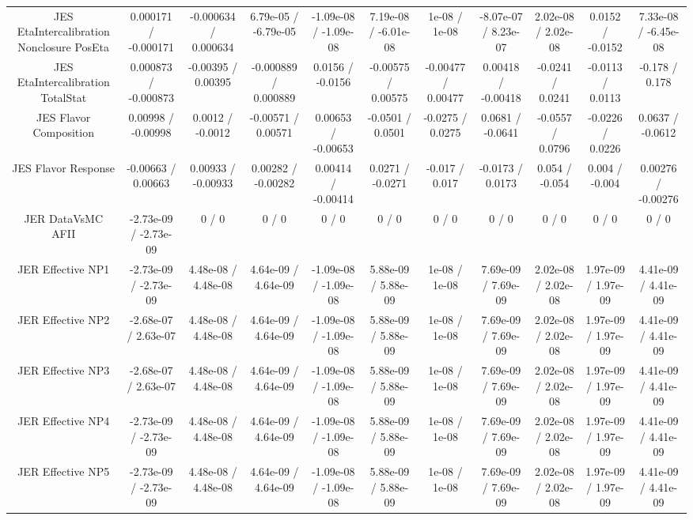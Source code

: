 \begin{table}[htbp]
\begin{center}
\begin{tabular}{|c|c|c|c|c|c|c|c|c|c|c|}
  JES EtaIntercalibration Nonclosure PosEta & 0.000171 / -0.000171 & -0.000634 / 0.000634 & 6.79e-05 / -6.79e-05 & -1.09e-08 / -1.09e-08 & 7.19e-08 / -6.01e-08 & 1e-08 / 1e-08 & -8.07e-07 / 8.23e-07 & 2.02e-08 / 2.02e-08 & 0.0152 / -0.0152 & 7.33e-08 / -6.45e-08 \\ 
  JES EtaIntercalibration TotalStat & 0.000873 / -0.000873 & -0.00395 / 0.00395 & -0.000889 / 0.000889 & 0.0156 / -0.0156 & -0.00575 / 0.00575 & -0.00477 / 0.00477 & 0.00418 / -0.00418 & -0.0241 / 0.0241 & -0.0113 / 0.0113 & -0.178 / 0.178 \\ 
  JES Flavor Composition & 0.00998 / -0.00998 & 0.0012 / -0.0012 & -0.00571 / 0.00571 & 0.00653 / -0.00653 & -0.0501 / 0.0501 & -0.0275 / 0.0275 & 0.0681 / -0.0641 & -0.0557 / 0.0796 & -0.0226 / 0.0226 & 0.0637 / -0.0612 \\ 
  JES Flavor Response & -0.00663 / 0.00663 & 0.00933 / -0.00933 & 0.00282 / -0.00282 & 0.00414 / -0.00414 & 0.0271 / -0.0271 & -0.017 / 0.017 & -0.0173 / 0.0173 & 0.054 / -0.054 & 0.004 / -0.004 & 0.00276 / -0.00276 \\ 
  JER DataVsMC AFII & -2.73e-09 / -2.73e-09 & 0 / 0 & 0 / 0 & 0 / 0 & 0 / 0 & 0 / 0 & 0 / 0 & 0 / 0 & 0 / 0 & 0 / 0 \\ 
  JER Effective NP1 & -2.73e-09 / -2.73e-09 & 4.48e-08 / 4.48e-08 & 4.64e-09 / 4.64e-09 & -1.09e-08 / -1.09e-08 & 5.88e-09 / 5.88e-09 & 1e-08 / 1e-08 & 7.69e-09 / 7.69e-09 & 2.02e-08 / 2.02e-08 & 1.97e-09 / 1.97e-09 & 4.41e-09 / 4.41e-09 \\ 
  JER Effective NP2 & -2.68e-07 / 2.63e-07 & 4.48e-08 / 4.48e-08 & 4.64e-09 / 4.64e-09 & -1.09e-08 / -1.09e-08 & 5.88e-09 / 5.88e-09 & 1e-08 / 1e-08 & 7.69e-09 / 7.69e-09 & 2.02e-08 / 2.02e-08 & 1.97e-09 / 1.97e-09 & 4.41e-09 / 4.41e-09 \\ 
  JER Effective NP3 & -2.68e-07 / 2.63e-07 & 4.48e-08 / 4.48e-08 & 4.64e-09 / 4.64e-09 & -1.09e-08 / -1.09e-08 & 5.88e-09 / 5.88e-09 & 1e-08 / 1e-08 & 7.69e-09 / 7.69e-09 & 2.02e-08 / 2.02e-08 & 1.97e-09 / 1.97e-09 & 4.41e-09 / 4.41e-09 \\ 
  JER Effective NP4 & -2.73e-09 / -2.73e-09 & 4.48e-08 / 4.48e-08 & 4.64e-09 / 4.64e-09 & -1.09e-08 / -1.09e-08 & 5.88e-09 / 5.88e-09 & 1e-08 / 1e-08 & 7.69e-09 / 7.69e-09 & 2.02e-08 / 2.02e-08 & 1.97e-09 / 1.97e-09 & 4.41e-09 / 4.41e-09 \\ 
  JER Effective NP5 & -2.73e-09 / -2.73e-09 & 4.48e-08 / 4.48e-08 & 4.64e-09 / 4.64e-09 & -1.09e-08 / -1.09e-08 & 5.88e-09 / 5.88e-09 & 1e-08 / 1e-08 & 7.69e-09 / 7.69e-09 & 2.02e-08 / 2.02e-08 & 1.97e-09 / 1.97e-09 & 4.41e-09 / 4.41e-09 \\ 

\end{tabular}
\end{center}
\end{table}

